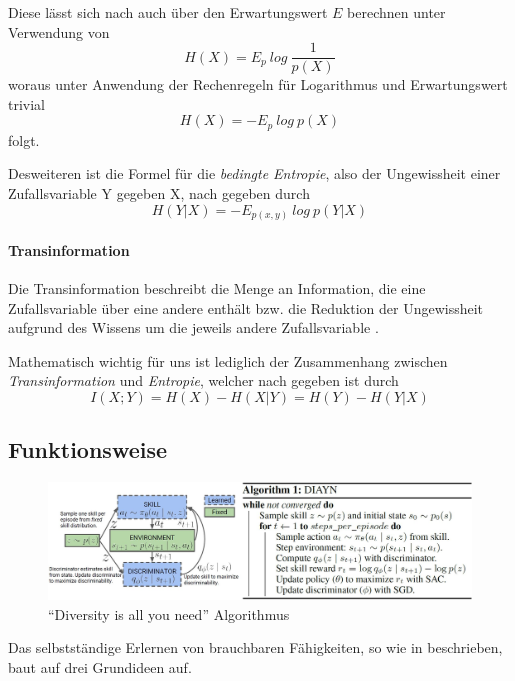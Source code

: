 Diese lässt sich nach \cite{elements_cover} auch über den Erwartungswert $ E $ berechnen unter Verwendung von
\begin{equation*}
    H(X) = E_p\ log\ \frac{1}{p(X)} \label{eq:entropy_1}
\end{equation*}
woraus unter Anwendung der Rechenregeln für Logarithmus und Erwartungswert trivial
\begin{equation}
    H(X) = - E_p\ log\ p(X) \label{eq:entropy_2}
\end{equation}
folgt.

Desweiteren ist die Formel für die \textit{bedingte Entropie}, also der Ungewissheit einer Zufallsvariable Y gegeben X, nach \cite{elements_cover} gegeben durch
\begin{equation}
    H(Y|X) = - E_{p(x,y)}\ log\ p(Y|X) \label{eq:condit_entropy}
\end{equation}

\paragraph{Transinformation}

Die Transinformation beschreibt die Menge an Information, die eine Zufallsvariable über eine andere enthält bzw. die Reduktion der Ungewissheit aufgrund des Wissens um die jeweils andere Zufallsvariable \cite{elements_cover}.

Mathematisch wichtig für uns ist lediglich der Zusammenhang zwischen \textit{Transinformation} und \textit{Entropie}, welcher nach \cite{elements_cover} gegeben ist durch
\begin{equation}
    I(X;Y) = H(X) - H(X|Y) = H(Y) - H(Y|X) \label{eq:trans_ent}
\end{equation}

\subsection{Funktionsweise}
\label{sec:diversity_howitworks}
\begin{figure}[h]
\includegraphics[width=\textwidth, keepaspectratio=true]{images/algorithm_diayn.JPG}
\caption{``Diversity is all you need'' Algorithmus} \label{img:diayn}
\end{figure}
Das selbstständige Erlernen von brauchbaren Fähigkeiten, so wie in \cite{diversity_eysenbach} beschrieben, baut auf drei Grundideen auf.

